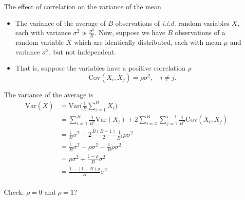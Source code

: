 \documentclass[10pt,ignorenonframetext,]{beamer}
\begin{document}
\begin{frame}

\begin{block}{The effect of correlation on the variance of the mean}

\vspace{2mm}

\begin{itemize}
\item
  The variance of the average of \(B\) observations of \emph{i.i.d.}
  random variables \(X\), each with variance \(\sigma^2\) is
  \(\frac{\sigma^2}{B}\). Now, suppose we have \(B\) observations of a
  random variable \(X\) which are identically distributed, each with
  mean \(\mu\) and variance \(\sigma^2\), but not independent.
\item
  That is, suppose the variables have a positive correlation \(\rho\)
  \[\text{Cov}(X_i, X_j) = \rho \sigma^2, \quad i \neq j.\]
\end{itemize}

\end{block}

\end{frame}

\begin{frame}

The variance of the average is
\[\begin{aligned} \text{Var}(\bar{X}) &= \text{Var}\Big( \frac{1}{B}\sum_{i=1}^B X_i \Big) \\
&= \sum_{i=1}^B \frac{1}{B^2} \text{Var} (X_i) + 2 \sum_{i=2}^B \sum_{j=1}^{i-1} \frac{1}{B^2} \text{Cov} (X_i, X_j) \\
&= \frac{1}{B} \sigma^2 + 2 \frac{B(B-1)}{2}\frac{1}{B^2} \rho \sigma^2 \\
&= \frac{1}{B} \sigma^2 + \rho \sigma^2 - \frac{1}{B} \rho \sigma^2 \\
&= \rho \sigma^2 + \frac{1-\rho}{B}\sigma^2\\
&= \frac{1-(1-B)\rho}{B} \sigma^2\\ \end{aligned}\]

Check: \(\rho=0\) and \(\rho=1\)?

\end{frame}
\end{document}
